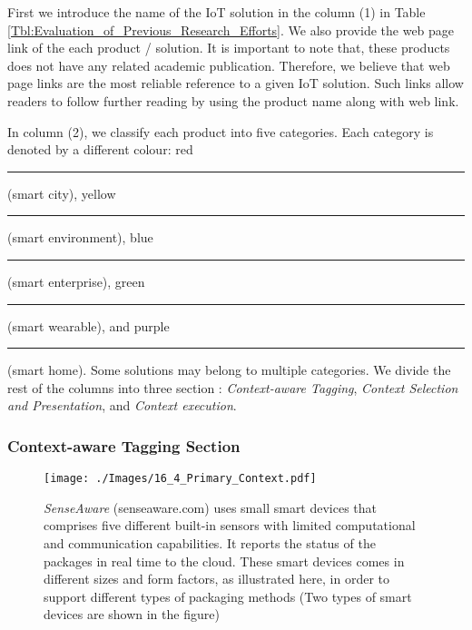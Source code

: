 \documentclass[journal]{IEEEtran}
\begin{document}
First we introduce the name of the IoT solution in the column (1) in Table \ref{Tbl:Evaluation_of_Previous_Research_Efforts}. We also provide the web page link of the each product / solution. It is important to note that, these products does not have any related academic publication. Therefore, we believe that web page links are the most reliable reference to a given IoT solution. Such links allow readers to follow further reading by using the product name along with web link.

In column (2), we classify each product into  five categories. Each category is denoted by a different colour: \iftrue red {\color{SC}\rule{0.2cm}{0.2cm}}   (smart city), yellow 
{\color{SN}\rule{0.2cm}{0.2cm}}  (smart environment), blue {\color{SE}\rule{0.2cm}{0.2cm}}  (smart enterprise), green  {\color{SW}\rule{0.2cm}{0.2cm}} (smart wearable), and purple {\color{SH}\rule{0.2cm}{0.2cm}} (smart home). \else red \catC  (smart city), yellow \catV   (smart environment), blue \catN  (smart enterprise), green \catW (smart wearable), and purple \catH (smart home). \fi Some solutions may belong to multiple categories. We  divide the rest of the columns into three section : \textit{Context-aware Tagging}, \textit{Context Selection and Presentation}, and \textit{Context execution}. 


\subsubsection{Context-aware Tagging Section}


 \begin{figure}[!b]
  \centering
  \vspace{-0.43cm}
  \texttt{[image: ./Images/16\_4\_Primary\_Context.pdf]}
\caption{\textit{SenseAware} (senseaware.com) uses small smart devices that comprises five different built-in sensors with limited computational and communication capabilities. It reports the status of the packages in real time to the cloud. These smart devices comes in different sizes and form factors, as illustrated here, in order to support different types of packaging methods (Two types of smart devices are shown in the figure)}
  \label{Figure:Primary_Context}	
\end{figure}
\end{document}

